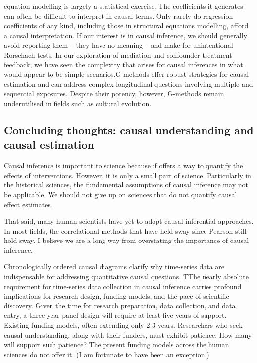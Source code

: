 \documentclass[
  singlecolumn]{report}
\begin{document}
\begin{enumerate}
  equation modelling is largely a statistical exercise. The coefficients
  it generates can often be difficult to interpret in causal terms. Only
  rarely do regression coefficients of any kind, including those in
  structural equations modelling, afford a causal interpretation. If our
  interest is in causal inference, we should generally avoid reporting
  them -- they have no meaning -- and make for unintentional Rorschach
  tests. In our exploration of mediation and confounder treatment
  feedback, we have seen the complexity that arises for causal
  inferences in what would appear to be simple scenarios.G-methods offer
  robust strategies for causal estimation and can address complex
  longitudinal questions involving multiple and sequential exposures.
  Despite their potency, however, G-methods remain underutilised in
  fields such as cultural evolution.
\end{enumerate}

\hypertarget{concluding-thoughts-causal-understanding-and-causal-estimation}{%
\subsection{Concluding thoughts: causal understanding and causal
estimation}\label{concluding-thoughts-causal-understanding-and-causal-estimation}}

Causal inference is important to science because if offers a way to
quantify the effects of interventions. However, it is only a small part
of science. Particularly in the historical sciences, the fundamental
assumptions of causal inference may not be applicable. We should not
give up on sciences that do not quantify causal effect estimates.

That said, many human scientists have yet to adopt causal inferential
approaches. In most fields, the correlational methods that have held
sway since Pearson still hold sway. I believe we are a long way from
overstating the importance of causal inference.

Chronologically ordered causal diagrams clarify why time-series data are
indispensable for addressing quantitative causal questions. TThe nearly
absolute requirement for time-series data collection in causal inference
carries profound implications for research design, funding models, and
the pace of scientific discovery. Given the time for research
preparation, data collection, and data entry, a three-year panel design
will require at least five years of support. Existing funding models,
often extending only 2-3 years. Researchers who seek causal
understanding, along with their funders, must exhibit patience. How many
will support such patience? The present funding models across the human
sciences do not offer it. (I am fortunate to have been an exception.)
\end{document}
